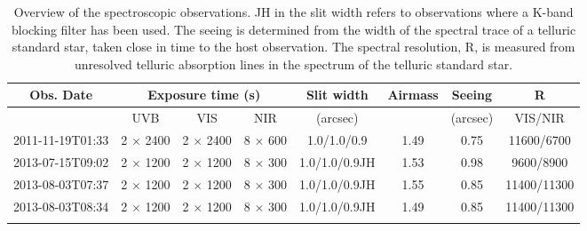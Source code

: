 \begin{table*}[!ht]

	\centering
	\caption{Overview of the spectroscopic observations. JH in the slit width refers to observations where a K-band blocking filter has been used. The seeing is determined from the width of the spectral trace of a telluric standard star, taken close in time to the host observation. The spectral resolution, R, is measured from unresolved telluric absorption lines in the spectrum of the telluric standard star. \label{tab:spec_overview}}
	\begin{tabular}{cccccccc}
		\hline\hline
		{Obs. Date} &  \multicolumn{3}{c}{Exposure time (s)} & Slit width & Airmass & Seeing & R   \\ [1.5pt]
        \hline
		{} & UVB  & VIS & NIR &  (arcsec)   & {} & (arcsec)  & {VIS/NIR}  \\ [1.5pt]
		\hline
		2011-11-19T01:33 & 2 $\times$ 2400 & 2 $\times$ 2400 & 8 $\times$ 600 & 1.0/1.0/0.9 & 1.49 & 0.75 & 11600/6700 \\
        2013-07-15T09:02 & 2 $\times$ 1200 & 2 $\times$ 1200 & 8 $\times$ 300 & 1.0/1.0/0.9JH & 1.53 & 0.98 & 9600/8900 \\
        2013-08-03T07:37 & 2 $\times$ 1200 & 2 $\times$ 1200 & 8 $\times$ 300 & 1.0/1.0/0.9JH & 1.55 & 0.85 & 11400/11300 \\
        2013-08-03T08:34 & 2 $\times$ 1200 & 2 $\times$ 1200 & 8 $\times$ 300 & 1.0/1.0/0.9JH & 1.49 & 0.85 & 11400/11300 \\
		
		\hline\noalign{\smallskip}
		
	\end{tabular}

\end{table*}